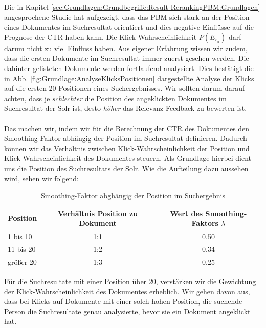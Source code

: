 Die in Kapitel \ref{sec:Grundlagen:Grundbegriffe:Result-RerankingPBM:Grundlagen} angesprochene Studie \cite{pbm} hat aufgezeigt, dass das PBM sich stark an der Position eines Dokumentes im Suchresultat orientiert und dies negative Einflüsse auf die Prognose der CTR haben kann. Die Klick-Wahrscheinlichkeit $P(E_{r_u})$ darf darum nicht zu viel Einfluss haben. Aus eigener Erfahrung wissen wir zudem, dass die ersten Dokumente im Suchresultat immer zuerst gesehen werden. Die dahinter gelisteten Dokumente werden fortlaufend analysiert. Dies bestätigt die in Abb. \ref{fig:Grundlage:AnalyseKlicksPositionen} dargestellte Analyse der Klicks auf die ersten 20 Positionen eines Suchergebnisses. Wir sollten darum darauf achten, dass je \textit{schlechter} die Position des angeklickten Dokumentes im Suchresultat der Solr ist, desto \textit{höher} das Relevanz-Feedback zu bewerten ist. 
\\
\\
Das machen wir, indem wir für die Berechnung der CTR des Dokumentes den Smoothing-Faktor abhängig der Position im Suchresultat definieren. Dadurch können wir das Verhältnis zwischen Klick-Wahrscheinlichkeit der Position und Klick-Wahrscheinlichkeit des Dokumentes steuern. Als Grundlage hierbei dient uns die Position des Suchresultats der Solr. Wie die Aufteilung dazu aussehen wird, sehen wir folgend:

\begin{table}[H]
\centering
\vspace{-.75em}
 \caption[Smoothing-Faktor abghängig der Position im Suchergebnis]{Smoothing-Faktor abghängig der Position im Suchergebnis}
\label{tab:VerhaeltnisKlick-WahrscheinlichkeitenPositionDokument}
\vspace{-.5em}
\footnotesize
\renewcommand*{\arraystretch}{1.2}
\begin{tabular}{lcc} \hline
	\textbf{Position} & \textbf{Verhältnis Position zu Dokument} & \textbf{Wert des Smoothing-Faktors $\lambda$}\\ \hline
	1 bis 10 & 1:1 & 0.50\\ \hline
	11 bis 20 & 1:2 & 0.34\\ \hline
	größer 20 &  1:3 & 0.25\\ \hline
 \end{tabular}
\vspace{-2em}
\end{table}

Für die Suchresultate mit einer Position über 20, verstärken wir die Gewichtung der Klick-Wahrscheinlichkeit des Dokumentes erheblich. Wir gehen davon aus, dass bei Klicks auf Dokumente mit einer solch hohen Position, die suchende Person die Suchresultate genau analysierte, bevor sie ein Dokument angeklickt hat.

